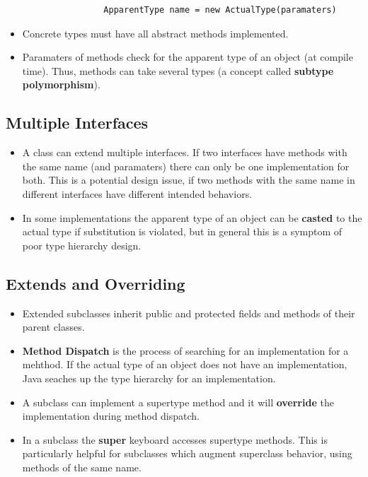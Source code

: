 \documentclass[letterpaper] {article}
\begin{document}
\begin{itemize}
            \begin{lstlisting}
                ApparentType name = new ActualType(paramaters)
            \end{lstlisting}
        \item Concrete types must have all abstract methods implemented. 
        \item Paramaters of methods check for the apparent type of an object (at compile time). Thus, methods can take several types (a concept called \textbf{subtype polymorphism}).
    \end{itemize}

    \subsection{Multiple Interfaces}
    \begin{itemize}
        \item A class can extend multiple interfaces. If two interfaces have methods with the same name (and paramaters) there can only be one implementation for both. This is a potential design issue, if two methods with the same name in different interfaces have different intended behaviors.
        \item In some implementations the apparent type of an object can be \textbf{casted} to the actual type if substitution is violated, but in general this is a symptom of poor type hierarchy design.
    \end{itemize}

    \subsection{Extends and Overriding}
    \begin{itemize}
        \item Extended subclasses inherit public and protected fields and methods of their parent classes.
        \item \textbf{Method Dispatch} is the process of searching for an implementation for a mehthod. If the actual type of an object does not have an implementation, Java seaches up the type hierarchy for an implementation.  
        \item A subclass can implement a supertype method and it will \textbf{override} the implementation during method dispatch. 
        \item In a subclass the \textbf{super} keyboard accesses supertype methods. This is particularly helpful for subclasses which augment superclass behavior, using methods of the same name. 
    \end{itemize}
\end{document}
